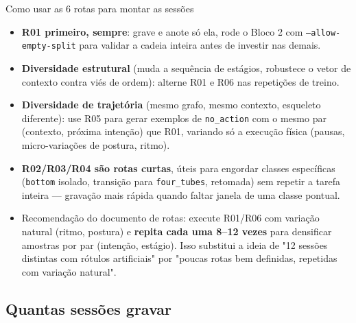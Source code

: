 \documentclass[11pt,a4paper]{article}
\begin{document}
\begin{infobox}{Como usar as 6 rotas para montar as sessões}
\begin{itemize}[leftmargin=1.5em]
\item \textbf{R01 primeiro, sempre}: grave e anote só ela, rode o Bloco 2
com \texttt{--allow-empty-split} para validar a cadeia inteira antes de
investir nas demais.
\item \textbf{Diversidade estrutural} (muda a sequência de estágios,
robustece o vetor de contexto contra viés de ordem): alterne R01 e R06 nas
repetições de treino.
\item \textbf{Diversidade de trajetória} (mesmo grafo, mesmo contexto,
esqueleto diferente): use R05 para gerar exemplos de \texttt{no\_action}
com o mesmo par (contexto, próxima intenção) que R01, variando só a
execução física (pausas, micro-variações de postura, ritmo).
\item \textbf{R02/R03/R04 são rotas curtas}, úteis para engordar classes
específicas (\texttt{bottom} isolado, transição para \texttt{four\_tubes},
retomada) sem repetir a tarefa inteira --- gravação mais rápida quando
faltar janela de uma classe pontual.
\item Recomendação do documento de rotas: execute R01/R06 com variação
natural (ritmo, postura) e \textbf{repita cada uma 8--12 vezes} para
densificar amostras por par (intenção, estágio). Isso substitui a ideia de
"12 sessões distintas com rótulos artificiais" por "poucas rotas bem
definidas, repetidas com variação natural".
\end{itemize}
\end{infobox}

\subsection{Quantas sessões gravar}
\label{sec:ordem-sessoes}
\end{document}
